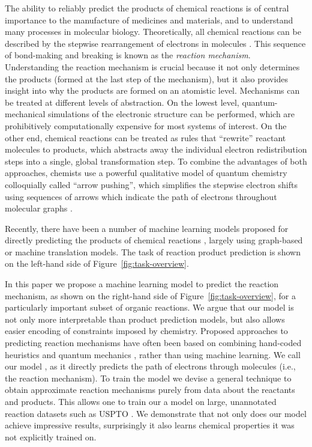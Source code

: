 
The ability to reliably predict the products of chemical reactions is of central importance to the manufacture of medicines and materials, and to understand many processes in molecular biology.
Theoretically, all chemical reactions can be described by the stepwise rearrangement of electrons in molecules \citep{herges1994organizing}. 
This sequence of bond-making and breaking is known as the \emph{reaction mechanism}. 
Understanding the reaction mechanism is crucial because it not only determines the products (formed at the last step of the mechanism), 
but it also provides insight into why the products are formed on an atomistic level. 
%
Mechanisms can be treated at different levels of abstraction. 
On the lowest level, quantum-mechanical simulations of the electronic structure can be performed, which are prohibitively computationally expensive for most systems of interest. 
On the other end, chemical reactions can be treated as rules that ``rewrite'' reactant molecules to products, which abstracts away the individual electron redistribution steps into a single, global transformation step. 
To combine the advantages of both approaches, chemists use a powerful qualitative model of quantum chemistry colloquially called ``arrow pushing'', which simplifies the stepwise electron shifts using sequences of arrows which indicate the path of electrons throughout molecular graphs \citep{herges1994organizing}. 

Recently, there have been a number of machine learning models proposed for directly predicting the products of chemical reactions \citep{coley2017prediction,jin2017predicting,schwaller2017found,neural-symbolic,segler2018planning,wei2016neural}, largely using graph-based or machine translation models. 
The task of reaction product prediction is shown on the left-hand side of Figure~\ref{fig:task-overview}. 

In this paper we propose a machine learning model to predict the reaction mechanism, as shown on the right-hand side of Figure~\ref{fig:task-overview}, for a particularly important subset of organic reactions.
We argue that our model is not only more interpretable than product prediction models, but also allows easier encoding of constraints imposed by chemistry.
Proposed approaches to predicting reaction mechanisms have often been based on combining hand-coded heuristics and quantum mechanics \citep{bergeler2015heuristics,kim2018efficient,nandi2017tabu,rappoport2014complex,simm2017context,zimmerman2013automated}, 
rather than using machine learning.
We call our model \ourModel, as it directly predicts the path of electrons through molecules (i.e., the reaction mechanism). 
To train the model we devise a general technique to obtain approximate reaction mechanisms purely from data about the reactants and products. 
This allows one to train our a model on large, unannotated reaction datasets such as USPTO \citep{lowe2012extraction}. We demonstrate that not only does our model achieve impressive results, surprisingly it also learns chemical properties it was not explicitly trained on.



